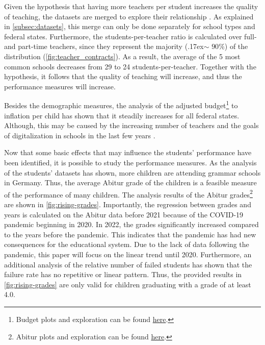 Given the hypothesis that having more teachers per student increases the quality of teaching, the datasets are merged to explore their relationship \cite{kasau_onesmus_mulei_pupil-teacher_2016,koc_impact_2015}. As explained in \autoref{subsec:datasets}, this merge can only be done separately for school types and federal states. Furthermore, the students-per-teacher ratio is calculated over full- and part-time teachers, since they represent the majority ({\raise.17ex\hbox{$\scriptstyle\mathtt{\sim}$}} $90\%$) of the distribution (\autoref{fig:teacher_contracts}). %
As a result, the average of the 5 most common schools decreases from 29 to 24 students-per-teacher. Together with the hypothesis, it follows that the quality of teaching will increase, and thus the performance measures will increase.



Besides the demographic measures, the analysis of the adjusted budget\footnote{\label{footnote:budget}Budget plots and exploration can be found \href{https://github.com/KarylReyne/DataLiteracyWS23/blob/main/exp/TF-007-SchoolBudgets.ipynb}{here}.} to inflation per child has shown that it steadily increases for all federal states. Although, this may be caused by the increasing number of teachers and the goals of digitalization in schools in the last few years \cite{cone_pandemic_2022}.

Now that some basic effects that may influence the students' performance have been identified, it is possible to study the performance measures. As the analysis of the students' datasets has shown, more children are attending grammar schools in Germany. Thus, the average Abitur grade of the children is a feasible measure of the performance of many children. The analysis results of the Abitur grades\footnote{\label{footnote:abi}Abitur plots and exploration can be found \href{https://github.com/KarylReyne/DataLiteracyWS23/blob/main/exp/TF-001-ExploreABIGrades.ipynb}{here}.} are shown in \autoref{fig:rising-grades}. Importantly, the regression between grades and years is calculated on the Abitur data before 2021 because of the COVID-19 pandemic beginning in 2020. In 2022, the grades significantly increased compared to the years before the pandemic. This indicates that the pandemic has had new consequences for the educational system. Due to the lack of data following the pandemic, this paper will focus on the linear trend until 2020. Furthermore, an additional analysis of the relative number of failed students has shown that the failure rate has no repetitive or linear pattern. Thus, the provided results in \autoref{fig:rising-grades} are only valid for children graduating with a grade of at least 4.0.

